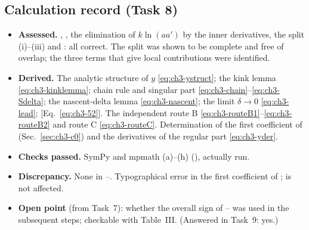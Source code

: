 \subsection{Calculation record (Task 8)}
\begin{itemize}[leftmargin=14pt]
\item \textbf{Assessed.} , , the elimination of $k\ln(aa')$ by the inner derivatives, the split (i)--(iii) and : all correct. The split was shown to be complete and free of
overlap; the three terms that give local contributions were identified.
\item \textbf{Derived.} The analytic structure of $y$ \eqref{eq:ch3-ystruct}; the kink lemma \eqref{eq:ch3-kinklemma}; chain rule and singular part \eqref{eq:ch3-chain}--\eqref{eq:ch3-Sdelta};
the nascent-delta lemma \eqref{eq:ch3-nascent}; the limit $\delta\to0$ \eqref{eq:ch3-lead};  [Eq.~\eqref{eq:ch3-52}].
The independent route B \eqref{eq:ch3-routeB1}--\eqref{eq:ch3-routeB2} and route C \eqref{eq:ch3-routeC}.
Determination of the first coefficient of  (Sec.~\ref{sec:ch3-c0}) and the derivatives of the regular part \eqref{eq:ch3-yder}.
\item \textbf{Checks passed.} SymPy and mpmath (a)--(h) (), actually run.
\item \textbf{Discrepancy.} None in --. Typographical error in the first coefficient of ;  is not affected.
\item \textbf{Open point} (from Task~7): whether the overall sign of -- was used in the subsequent steps; checkable with Table~III. (Answered in Task~9: yes.)
\end{itemize}
